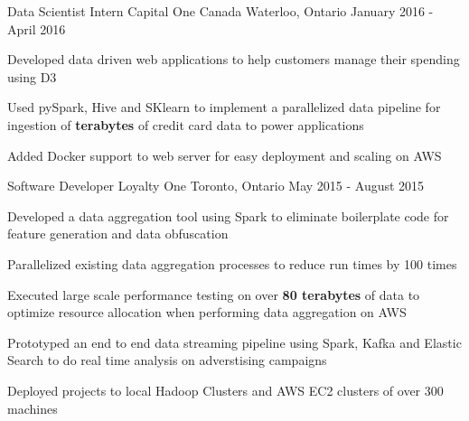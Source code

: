 \begin{cventries}

\cventry
{Data Scientist Intern}
{Capital One Canada}
{Waterloo, Ontario}
{January 2016 - April 2016}
{ %
\begin{cvitems}
\item {Developed data driven web applications to help customers manage their spending using D3}
\item {Used pySpark, Hive and SKlearn to implement a parallelized data pipeline for ingestion of \textbf{terabytes} of credit card data to power applications}
\item {Added Docker support to web server for easy deployment and scaling on AWS}
\end{cvitems}
}


\cventry
{Software Developer}
{Loyalty One} %
{Toronto, Ontario} %
{May 2015 - August 2015} %
{
\begin{cvitems}
\item {Developed a data aggregation tool using Spark to eliminate boilerplate code for feature generation and data obfuscation}
\item {Parallelized existing data aggregation processes to reduce run times by 100 times}
\item {Executed large scale performance testing on over \textbf{80 terabytes} of data to optimize resource allocation when performing data aggregation on AWS}
\item {Prototyped an end to end data streaming pipeline using Spark, Kafka and Elastic Search to do real time analysis on adverstising campaigns}
\item {Deployed projects to local Hadoop Clusters and AWS EC2 clusters of over 300 machines}
\end{cvitems}
}


\end{cventries}
